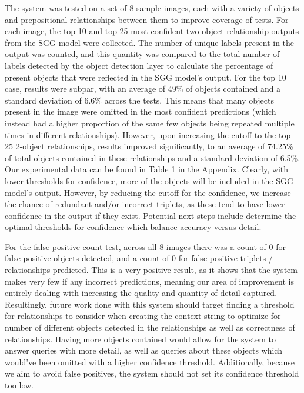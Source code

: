 \documentclass[letterpaper, 10 pt, conference]{ieeeconf}  %
\begin{document}
    The system was tested on a set of 8 sample images, each with a variety of objects and prepositional relationships between them to improve coverage of tests. For each image, the top 10 and top 25 most confident two-object relationship outputs from the SGG model were collected. The number of unique labels present in the output was counted, and this quantity was compared to the total number of labels detected by the object detection layer to calculate the percentage of present objects that were reflected in the SGG model's output. For the top 10 case, results were subpar, with an average of 49\% of objects contained and a standard deviation of 6.6\% across the tests. This means that many objects present in the image were omitted in the most confident predictions (which instead had a higher proportion of the same few objects being repeated multiple times in different relationships). However, upon increasing the cutoff to the top 25 2-object relationships, results improved significantly, to an average of 74.25\% of total objects contained in these relationships and a standard deviation of 6.5\%. Our experimental data can be found in Table 1 in the Appendix. Clearly, with lower thresholds for confidence, more of the objects will be included in the SGG model's output. However, by reducing the cutoff for the confidence, we increase the chance of redundant and/or incorrect triplets, as these tend to have lower confidence in the output if they exist. Potential next steps include determine the optimal thresholds for confidence which balance accuracy versus detail. 
    
    For the false positive count test, across all 8 images there was a count of 0 for false positive objects detected, and a count of 0 for false positive triplets / relationships predicted. This is a very positive result, as it shows that the system makes very few if any incorrect predictions, meaning our area of improvement is entirely dealing with increasing the quality and quantity of detail captured. Resultingly, future work done with this system should target finding a threshold for relationships to consider when creating the context string to optimize for number of different objects detected in the relationships as well as correctness of relationships. Having more objects contained would allow for the system to answer queries with more detail, as well as queries about these objects which would've been omitted with a higher confidence threshold. Additionally, because we aim to avoid false positives, the system should not set its confidence threshold too low.
\end{document}
